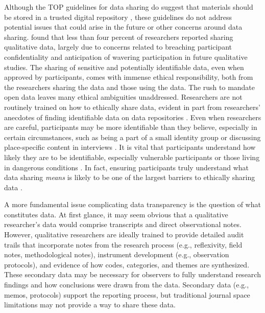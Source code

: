 \documentclass[authordate, meta, issue]{jote-new-article}
\begin{document}
Although the TOP guidelines for data sharing do suggest that materials should be stored in a trusted digital repository \parencites[page 5]{Nosek2015}, these guidelines do not address potential issues that could arise in the future \parencites[e.g., guidelines for updating data;][]{Lash2015} or other concerns around data sharing. \textcites{Mozersky2020} found that less than four percent of researchers reported sharing qualitative data, largely due to concerns related to breaching participant confidentiality and anticipation of wavering participation in future qualitative studies. The sharing of sensitive and potentially identifiable data, even when approved by participants, comes with immense ethical responsibility, both from the researchers sharing the data and those using the data. The rush to mandate open data leaves many ethical ambiguities unaddressed. Researchers are not routinely trained on how to ethically share data, evident in part from researchers’ anecdotes of finding identifiable data on data repositories \parencites[e.g.,][]{Elson2021}. Even when researchers are careful, participants may be more identifiable than they believe, especially in certain circumstances, such as being a part of a small identity group or discussing place-specific content in interviews \parencites{Gow2020}. It is vital that participants understand how likely they are to be identifiable, especially vulnerable participants or those living in dangerous conditions \parencites{Ross2018}{Small2014}. In fact, ensuring participants truly understand what data sharing \emph{means }is likely to be one of the largest barriers to ethically sharing data \parencites{VandeVusse2022}.



A more fundamental issue complicating data transparency is the question of what constitutes data. At first glance, it may seem obvious that a qualitative researcher’s data would comprise transcripts and direct observational notes. However, qualitative researchers are ideally trained to provide detailed audit trails that incorporate notes from the research process (e.g., reflexivity, field notes, methodological notes), instrument development (e.g., observation protocols), and evidence of how codes, categories, and themes are synthesized. These secondary data may be necessary for observers to fully understand research findings and how conclusions were drawn from the data. Secondary data (e.g., memos, protocols) support the reporting process, but traditional journal space limitations may not provide a way to share these data.
\end{document}
